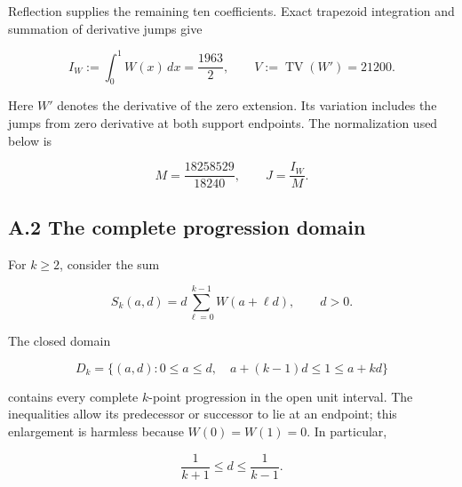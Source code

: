 \documentclass[11pt,a4paper]{article}
\begin{document}
\begin{samepage}

Reflection supplies the remaining ten coefficients. Exact trapezoid
integration and summation of derivative jumps give

\[
I_W:=\int_0^1W(x)\,dx=\frac{1963}{2},
\qquad V:=\operatorname{TV}(W')=21200.
\]

\end{samepage}

\begin{samepage}

Here \(W'\) denotes the derivative of the zero extension. Its variation
includes the jumps from zero derivative at both support endpoints. The
normalization used below is

\[M=\frac{18258529}{18240},\qquad J=\frac{I_W}{M}.\]

\end{samepage}


\hypertarget{a.2-the-complete-progression-domain}{%
\subsection{A.2 The complete progression
domain}\label{a.2-the-complete-progression-domain}}

\begin{samepage}

For \(k\ge2\), consider the sum

\[S_k(a,d)=d\sum_{\ell=0}^{k-1}W(a+\ell d),\qquad d>0.\]

\end{samepage}

\begin{samepage}

The closed domain

\[
D_k=\{(a,d):0\le a\le d,\quad a+(k-1)d\le1\le a+kd\}
\]

\end{samepage}

\begin{samepage}

contains every complete \(k\)-point progression in the open unit
interval. The inequalities allow its predecessor or successor to lie at
an endpoint; this enlargement is harmless because \(W(0)=W(1)=0\). In
particular,

\[\frac1{k+1}\le d\le\frac1{k-1}.\]

\end{samepage}
\end{document}
